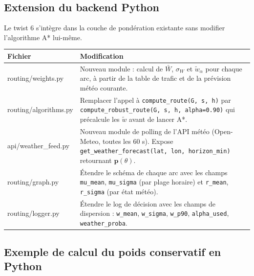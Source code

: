 \documentclass[12pt,a4paper]{article}
\theoremstyle{definition}
\theoremstyle{remark}
\begin{document}
\subsection{Extension du backend Python}

Le twist 6 s'intègre dans la couche de pondération existante
sans modifier l'algorithme A* lui-même.

\begin{center}
\begin{tabular}{>{\ttfamily}p{4.5cm} p{8.5cm}}
  \toprule
  \textbf{Fichier} & \textbf{Modification} \\
  \midrule
  routing/weights.py &
    Nouveau module : calcul de $\bar{W}$, $\sigma_W$ et $\tilde{w}_\alpha$
    pour chaque arc, à partir de la table de trafic et de la prévision
    météo courante. \\[0.4em]
  routing/algorithms.py &
    Remplacer l'appel à \texttt{compute\_route(G, s, h)} par
    \texttt{compute\_robust\_route(G, s, h, alpha=0.90)} qui précalcule
    les $\tilde{w}$ avant de lancer A*. \\[0.4em]
  api/weather\_feed.py &
    Nouveau module de polling de l'API météo (Open-Meteo, toutes les
    60 s). Expose \texttt{get\_weather\_forecast(lat, lon, horizon\_min)}
    retournant $\mathbf{p}(\theta)$. \\[0.4em]
  routing/graph.py &
    Étendre le schéma de chaque arc avec les champs \texttt{mu\_mean},
    \texttt{mu\_sigma} (par plage horaire) et \texttt{r\_mean},
    \texttt{r\_sigma} (par état météo). \\[0.4em]
  routing/logger.py &
    Étendre le log de décision avec les champs de dispersion :
    \texttt{w\_mean}, \texttt{w\_sigma}, \texttt{w\_p90},
    \texttt{alpha\_used}, \texttt{weather\_proba}. \\
  \bottomrule
\end{tabular}
\end{center}

\subsection{Exemple de calcul du poids conservatif en Python}
\end{document}
